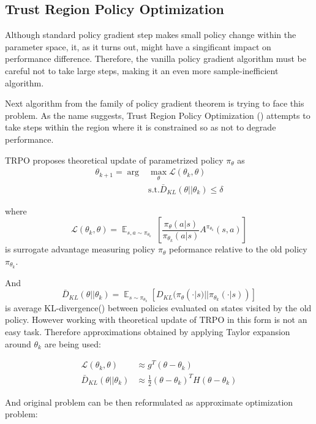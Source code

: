 \subsection{Trust Region Policy Optimization}
Although standard policy gradient step makes small policy change within the parameter space, it, as it turns out, might have a singificant impact on performance difference.
Therefore, the vanilla policy gradient algorithm must be careful not to take large steps, making it an even more sample-inefficient algorithm.

Next algorithm from the family of policy gradient theorem is trying to face this problem.
As the name suggests, Trust Region Policy Optimization (\cite{TRPO}) attempts to take steps within the region where it is constrained so as not to degrade performance.

TRPO proposes theoretical update of parametrized policy $\pi_\theta$ as 
\begin{align*}
  \theta_{k+1} = \arg &\max_\theta \mathcal{L}(\theta_k,\theta)   \\  
  &\text{s.t.}  \bar{D}_{KL}(\theta||\theta_k) \leq \delta
\end{align*}

where \[\mathcal{L}(\theta_k,\theta) = \mathop{\mathbb{E}}_{s,a \sim \pi_{\theta_k}} \ \left[ \frac{\pi_\theta(a|s)}{\pi_{\theta_k}(a|s)}A^{\pi_{\theta_k}} (s,a) \right] \]
is surrogate advantage measuring policy $\pi_\theta$ peformance relative to the old policy $\pi_{\theta_k}$.

And \[\bar{D}_{KL}(\theta||\theta_k) = \mathop{\mathbb{E}}_{s \sim \pi_{\theta_k}}[D_{KL}(\pi_\theta(\cdot|s)||\pi_{\theta_k}(\cdot|s))]\] is average KL-divergence(\cite{KLDIV}) between policies evaluated on states visited by the old policy.
However working with theoretical update of TRPO in this form is not an easy task. 
Therefore approximations obtained by applying Taylor expansion around $\theta_k$ are being used:

\begin{align*}
  \mathcal{L}(\theta_k,\theta) &\approx g^T(\theta - \theta_k) \\
  \bar{D}_{KL}(\theta||\theta_k) &\approx \frac{1}{2} (\theta-\theta_k)^TH(\theta-\theta_k)
\end{align*}

And original problem can be then reformulated as approximate optimization problem:

